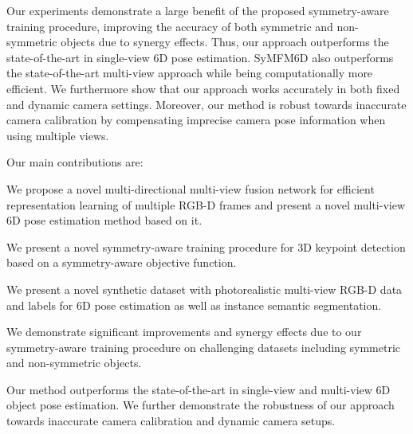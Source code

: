 Our experiments demonstrate a large benefit of the proposed symmetry-aware training procedure, improving the accuracy of both symmetric and non-symmetric objects due to synergy effects. Thus, our approach outperforms the state-of-the-art in single-view 6D pose estimation. SyMFM6D also outperforms the state-of-the-art multi-view approach while being computationally more efficient. We furthermore show that our approach works accurately in both fixed and dynamic camera settings. Moreover, our method is robust towards inaccurate camera calibration by compensating imprecise camera pose information when using multiple views.


Our main contributions are:

\begin{enumerate*}[label=\enumlabel]
    \item We propose a novel multi-directional multi-view fusion network for efficient representation learning of multiple RGB-D frames and present a novel multi-view 6D pose estimation method based on it.
    \item We present a novel symmetry-aware training procedure for 3D keypoint detection based on a symmetry-aware objective function.
    \item We present a novel synthetic dataset with photorealistic multi-view \mbox{RGB-D} data and labels for 6D pose estimation as well as instance semantic segmentation.
	\item We demonstrate significant improvements and synergy effects due to our symmetry-aware training procedure on challenging datasets including symmetric and non-symmetric objects.
	\item Our method outperforms the state-of-the-art in single-view and multi-view 6D object pose estimation. We further demonstrate the robustness of our approach towards inaccurate camera calibration and dynamic camera setups. 
\end{enumerate*}

